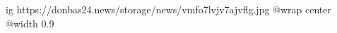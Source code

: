  
 
 
 
 

\ifcmt
  ig https://donbas24.news/storage/news/vmfo7lvjv7ajvflg.jpg
  @wrap center
  @width 0.9
\fi
